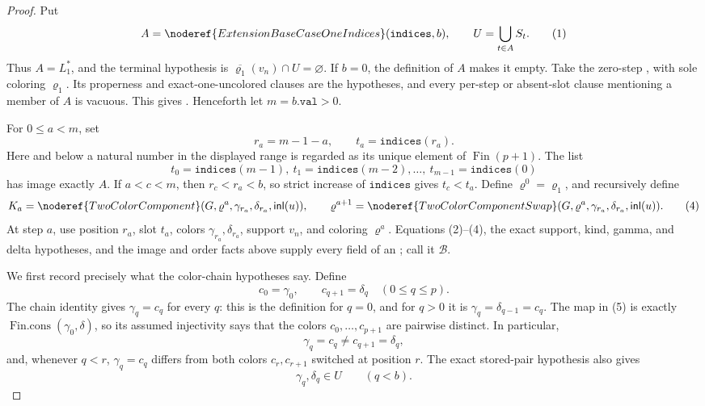 \begin{proof}
Put
\[
 A=\noderef{ExtensionBaseCaseOneIndices}(\mathtt{indices},b),
 \qquad
 U=\bigcup_{t\in A}S_t .                                     \tag{1}
\]
Thus \(A=L_1^*\), and the terminal hypothesis is
\(\overline{\varrho_1}(v_n)\cap U=\varnothing\).  If \(b=0\), the
definition of \(A\) makes it empty.  Take the zero-step
, with sole coloring
\(\varrho_1\).  Its properness and exact-one-uncolored clauses are the
hypotheses, and every per-step or absent-slot clause mentioning a member
of \(A\) is vacuous.  This gives
.  Henceforth let
\(m=b.\mathtt{val}>0\).

For \(0\leq a<m\), set
\[
 r_a=m-1-a,\qquad t_a=\mathtt{indices}(r_a).                  \tag{2}
\]
Here and below a natural number in the displayed range is regarded as its
unique element of \(\operatorname{Fin}(p+1)\).  The list
\[
 t_0=\mathtt{indices}(m-1),\ t_1=\mathtt{indices}(m-2),
 \ldots,\ t_{m-1}=\mathtt{indices}(0)                         \tag{3}
\]
has image exactly \(A\).  If \(a<c<m\), then \(r_c<r_a<b\), so strict
increase of \(\mathtt{indices}\) gives \(t_c<t_a\).  Define
\(\varrho^0=\varrho_1\), and recursively define
\[
 K_a=\noderef{TwoColorComponent}
   (G,\varrho^a,\gamma_{r_a},\delta_{r_a},\mathsf{inl}(u)),
 \qquad
 \varrho^{a+1}=\noderef{TwoColorComponentSwap}
   (G,\varrho^a,\gamma_{r_a},\delta_{r_a},\mathsf{inl}(u)).   \tag{4}
\]
At step \(a\), use position \(r_a\), slot \(t_a\), colors
\(\gamma_{r_a},\delta_{r_a}\), support \(v_n\), and coloring
\(\varrho^a\).  Equations (2)--(4), the exact support, kind, gamma, and
delta hypotheses, and the image and order facts above supply every field
of an ; call it \(\mathcal B\).

We first record precisely what the color-chain hypotheses say.  Define
\[
 c_0=\gamma_0,\qquad c_{q+1}=\delta_q\quad(0\leq q\leq p).    \tag{5}
\]
The chain identity gives \(\gamma_q=c_q\) for every \(q\): this is the
definition for \(q=0\), and for \(q>0\) it is
\(\gamma_q=\delta_{q-1}=c_q\).  The map in (5) is exactly
\(\operatorname{Fin.cons}(\gamma_0,\delta)\), so its assumed
injectivity says that the colors \(c_0,\ldots,c_{p+1}\) are pairwise
distinct.  In particular,
\[
 \gamma_q=c_q\ne c_{q+1}=\delta_q,                            \tag{6}
\]
and, whenever \(q<r\), \(\gamma_q=c_q\) differs from both colors
\(c_r,c_{r+1}\) switched at position \(r\).  The exact stored-pair
hypothesis also gives
\[
        \gamma_q,\delta_q\in U\qquad(q<b).                   \tag{7}
\]


\end{proof}
